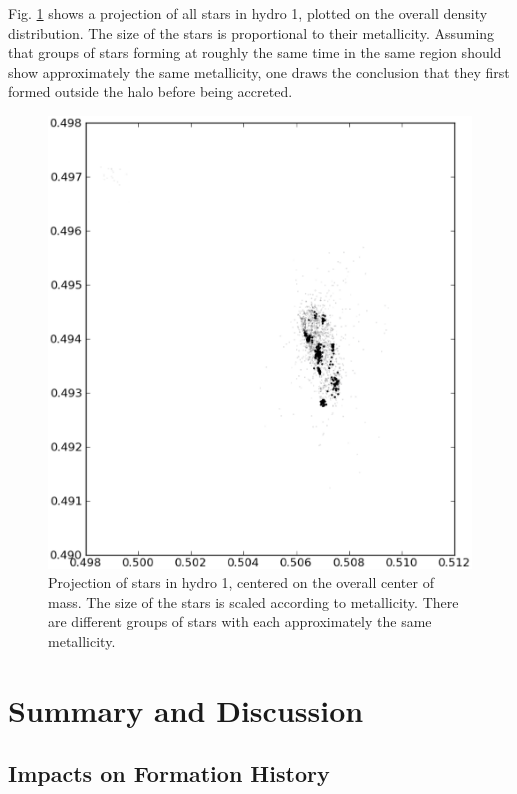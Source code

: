 \documentclass[useAMS,usenatbib]{mn2e}
\begin{document}
Fig. \ref{fig:star_proj_1} shows a projection of all stars in {\sc
  hydro 1}, plotted on the overall density distribution. The size of
the stars is proportional to their metallicity. Assuming that groups
of stars forming at roughly the same time in the same region should
show approximately the same metallicity, one draws the conclusion that
they first formed outside the halo before being accreted.

\begin{figure}
  \begin{center}
    \includegraphics[width=\textwidth]{fig/star_proj_1.eps}
  \end{center}
  \caption{\label{fig:star_proj_1}Projection of stars in {\sc hydro
      1}, centered on the overall center of mass. The size of the
    stars is scaled according to metallicity. There are different
    groups of stars with each approximately the same metallicity.}
\end{figure}


\section{Summary and Discussion}
\label{sec:sum}

\subsection{Impacts on Formation History}
\end{document}
